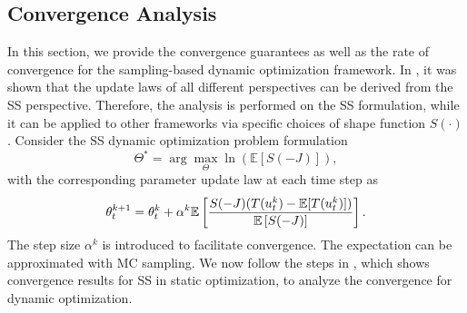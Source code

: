 \documentclass[twoside,11pt]{article}
\begin{document}
\subsection{Convergence Analysis}
\label{sec: convergence}
In this section, we provide the convergence guarantees as well as the rate of convergence for the sampling-based dynamic optimization framework. In , it was shown that the update laws of all different perspectives can be derived from the \ac{SS} perspective. Therefore, the analysis is performed on the \ac{SS} formulation, while it can be applied to other frameworks via specific choices of shape function $S(\cdot)$. Consider the \ac{SS} dynamic optimization problem formulation
\begin{equation}
\Theta^* = \arg\max_\Theta \ln\left(\mathbb{E}\left[S\left(- J\right)\right]\right),
\end{equation}
with the corresponding parameter update law at each time step as
\begin{equation}
\theta^{k+1}_t = \theta_t^k + \alpha^k\mathbb{E}\left[\frac{S(-J)(T(u_t^k)-\mathbb{E}[T(u_t^k)])}{\mathbb{E}\left[S(-J)\right]}\right].
\end{equation}
The step size $\alpha^k$ is introduced to facilitate convergence. The expectation can be approximated with \ac{MC} sampling. We now follow the steps in \cite{zhou2014gradient}, which shows convergence results for \ac{SS} in static optimization, to analyze the convergence for dynamic optimization.
\end{document}
